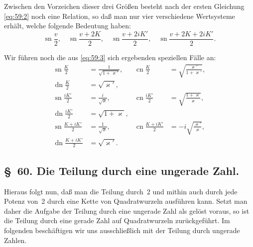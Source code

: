 \documentclass[11pt,a4paper]{article}
\theoremstyle{plain}
\theoremstyle{remark}
\begin{document}
\noindent
Zwischen den Vorzeichen dieser drei Größen besteht nach der
ersten Gleichung \eqref{eq:59:2} noch eine Relation, so daß man
nur vier verschiedene Wertsysteme erhält, welche folgende
Bedeutung haben:
\[
\operatorname{sn}\frac{v}{2},\quad
\operatorname{sn}\frac{v+2K}{2},\quad
\operatorname{sn}\frac{v+2iK'}{2},\quad
\operatorname{sn}\frac{v+2K+2iK'}{2}.
\]

\noindent
Wir führen noch die aus \eqref{eq:59:3} sich ergebenden
speziellen Fälle an:
\begin{align*}
\operatorname{sn}\frac{K}{2}     &= \frac{1}{\sqrt{1+\varkappa'}}, &
\operatorname{cn}\frac{K}{2}     &= \sqrt{\frac{\varkappa'}{1+\varkappa'}},\\
\operatorname{dn}\frac{K}{2}     &= \sqrt{\varkappa'}, \\
\operatorname{sn}\frac{iK'}{2}   &= \frac{i}{\sqrt{\varkappa}}, &
\operatorname{cn}\frac{iK'}{2}   &= \sqrt{\frac{1+\varkappa}{\varkappa}},\\
\operatorname{dn}\frac{iK'}{2}   &= \sqrt{1+\varkappa}, \\
\operatorname{sn}\frac{K+iK'}{2} &= \frac{1}{\sqrt{\varkappa}}, &
\operatorname{cn}\frac{K+iK'}{2} &= -i\sqrt{\frac{\varkappa'}{\varkappa}},\\
\operatorname{dn}\frac{K+iK'}{2} &= \sqrt{\varkappa'}.
\end{align*}
\vspace{0.5\baselineskip}

\subsection*{\S~60. Die Teilung durch eine ungerade Zahl.}

Hieraus folgt nun, daß man die Teilung durch~2 und mithin
auch durch jede Potenz von~2 durch eine Kette von
Quadratwurzeln ausführen kann. Setzt man daher die Aufgabe
der Teilung durch eine ungerade Zahl als gelöst voraus, so ist
die Teilung durch eine gerade Zahl auf Quadratwurzeln
zurückgeführt. Im folgenden beschäftigen wir uns
ausschließlich mit der Teilung durch ungerade Zahlen.
\end{document}
